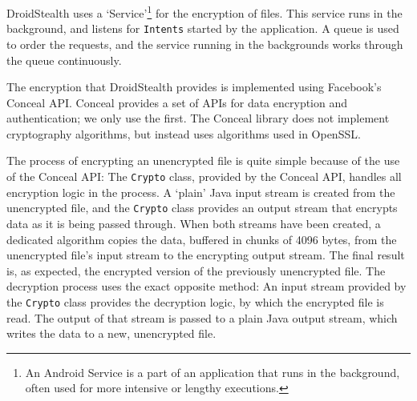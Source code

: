 DroidStealth uses a `Service'\footnote{An Android Service is a part of an application that runs in the background, often used for more intensive or lengthy executions.} for the encryption of files.
This service runs in the background, and listens for \texttt{Intents} started by the application.
A queue is used to order the requests, and the service running in the backgrounds works through the queue continuously.

The encryption that DroidStealth provides is implemented using Facebook's Conceal API\cite{facebookConceal}.
Conceal provides a set of APIs for data encryption and authentication; we only use the first.
The Conceal library does not implement cryptography algorithms, but instead uses algorithms used in OpenSSL\cite{openssl}.

The process of encrypting an unencrypted file is quite simple because of the use of the Conceal API:
The \texttt{Crypto} class, provided by the Conceal API, handles all encryption logic in the process.
A `plain' Java input stream is created from the unencrypted file, and the \texttt{Crypto} class provides an output stream that encrypts data as it is being passed through.
When both streams have been created, a dedicated algorithm copies the data, buffered in chunks of 4096 bytes, from the unencrypted file's input stream to the encrypting output stream.
The final result is, as expected, the encrypted version of the previously unencrypted file.
The decryption process uses the exact opposite method:
An input stream provided by the \texttt{Crypto} class provides the decryption logic, by which the encrypted file is read.
The output of that stream is passed to a plain Java output stream, which writes the data to a new, unencrypted file.
